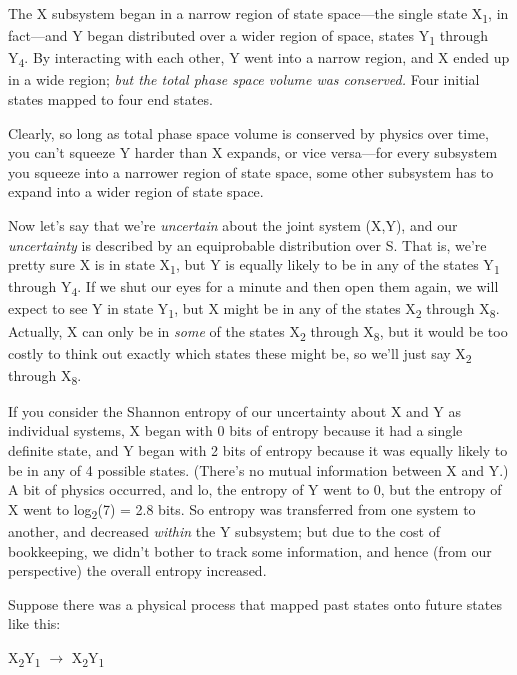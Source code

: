 {
 The X subsystem began in a narrow region of state space---the
single state X\textsubscript{1}, in fact---and Y began distributed over
a wider region of space, states Y\textsubscript{1} through
Y\textsubscript{4}. By interacting with each other, Y went into a
narrow region, and X ended up in a wide region; \textit{but the total
phase space volume was conserved.} Four initial states mapped to four
end states.}

{
 Clearly, so long as total phase space volume is conserved by
physics over time, you can't squeeze Y harder than X
expands, or vice versa---for every subsystem you squeeze into a
narrower region of state space, some other subsystem has to expand into
a wider region of state space.}

{
 Now let's say that we're
\textit{uncertain} about the joint system (X,Y), and our
\textit{uncertainty} is described by an equiprobable distribution over
S. That is, we're pretty sure X is in state
X\textsubscript{1}, but Y is equally likely to be in any of the states
Y\textsubscript{1} through Y\textsubscript{4}. If we shut our eyes for
a minute and then open them again, we will expect to see Y in state
Y\textsubscript{1}, but X might be in any of the states
X\textsubscript{2} through X\textsubscript{8}. Actually, X can only be
in \textit{some} of the states X\textsubscript{2} through
X\textsubscript{8}, but it would be too costly to think out exactly
which states these might be, so we'll just say
X\textsubscript{2} through X\textsubscript{8}.}

{
 If you consider the Shannon entropy of our uncertainty about X and
Y as individual systems, X began with 0 bits of entropy because it had
a single definite state, and Y began with 2 bits of entropy because it
was equally likely to be in any of 4 possible states.
(There's no mutual information between X and Y.) A bit
of physics occurred, and lo, the entropy of Y went to 0, but the
entropy of X went to log\textsubscript{2}(7) = 2.8 bits. So entropy was
transferred from one system to another, and decreased \textit{within}
the Y subsystem; but due to the cost of bookkeeping, we
didn't bother to track some information, and hence
(from our perspective) the overall entropy increased.}

{
 Suppose there was a physical process that mapped past states onto
future states like this:}

{\centering
 X\textsubscript{2}Y\textsubscript{1} $\rightarrow $
X\textsubscript{2}Y\textsubscript{1}
\par}


